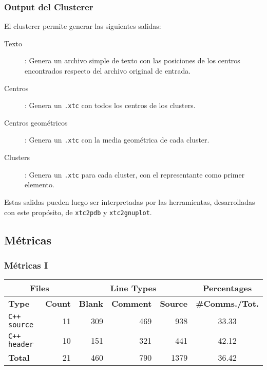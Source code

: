 \documentclass[xcolor=pdftex,dvipsnames,table,10pt,babel,spanish]{beamer}
\begin{document}
\begin{frame}
 \frametitle{Output del Clusterer}
 
El clusterer permite generar las siguientes salidas:

\begin{description}
 \item [Texto]: Genera un archivo simple de texto con las posiciones de los centros encontrados respecto del archivo original de entrada.
 \pause
 \item [Centros]: Genera un \texttt{.xtc} con todos los centros de los clusters.
 \pause
 \item [Centros geom\'etricos]: Genera un \texttt{.xtc} con la media geom\'etrica de cada cluster.
 \pause
 \item [Clusters]: Genera un \texttt{.xtc} para cada cluster, con el representante como primer elemento.
\end{description}

\pause

Estas salidas pueden luego ser interpretadas por las herramientas, desarrolladas con este prop\'osito, de \texttt{xtc2pdb} y \texttt{xtc2gnuplot}.

\end{frame}


\subsection*{M\'etricas}

\begin{frame}
 \frametitle{M\'etricas I}
 
\begin{center}
\begin{tabular}{|l|r|r|r|r|c|}
\hline
\multicolumn{2}{|c|}{Files} & \multicolumn{3}{|c|}{Line Types} & Percentages \\
\hline
\textbf{Type} & \textbf{Count} & \textbf{Blank} & \textbf{Comment} & \textbf{Source} & \small{\textbf{\#Comms./Tot.}}\\ 
\hline
\texttt{C++ source} & 11   &    309  &     469   &    938 & 33.33\\
\hline
\texttt{C++ header} & 10   &    151  &     321   &    441 & 42.12\\
\hline
\textbf{Total}      &  21  &     460 &      790  &    1379 & 36.42\\
\hline
\end{tabular}
\end{center}

\end{frame}
\end{document}
